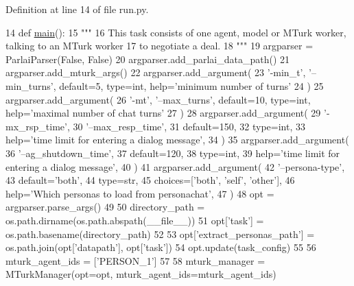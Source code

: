 Definition at line 14 of file run.\+py.


\begin{DoxyCode}
14 \textcolor{keyword}{def }\hyperlink{namespaceprojects_1_1wizard__of__wikipedia_1_1mturk__evaluation__task_1_1run_ad3ab2c71f8083c3112815c0b363d316b}{main}():
15     \textcolor{stringliteral}{"""}
16 \textcolor{stringliteral}{    This task consists of one agent, model or MTurk worker, talking to an MTurk worker}
17 \textcolor{stringliteral}{    to negotiate a deal.}
18 \textcolor{stringliteral}{    """}
19     argparser = ParlaiParser(\textcolor{keyword}{False}, \textcolor{keyword}{False})
20     argparser.add\_parlai\_data\_path()
21     argparser.add\_mturk\_args()
22     argparser.add\_argument(
23         \textcolor{stringliteral}{'-min\_t'}, \textcolor{stringliteral}{'--min\_turns'}, default=5, type=int, help=\textcolor{stringliteral}{'minimum number of turns'}
24     )
25     argparser.add\_argument(
26         \textcolor{stringliteral}{'-mt'}, \textcolor{stringliteral}{'--max\_turns'}, default=10, type=int, help=\textcolor{stringliteral}{'maximal number of chat turns'}
27     )
28     argparser.add\_argument(
29         \textcolor{stringliteral}{'-mx\_rsp\_time'},
30         \textcolor{stringliteral}{'--max\_resp\_time'},
31         default=150,
32         type=int,
33         help=\textcolor{stringliteral}{'time limit for entering a dialog message'},
34     )
35     argparser.add\_argument(
36         \textcolor{stringliteral}{'--ag\_shutdown\_time'},
37         default=120,
38         type=int,
39         help=\textcolor{stringliteral}{'time limit for entering a dialog message'},
40     )
41     argparser.add\_argument(
42         \textcolor{stringliteral}{'--persona-type'},
43         default=\textcolor{stringliteral}{'both'},
44         type=str,
45         choices=[\textcolor{stringliteral}{'both'}, \textcolor{stringliteral}{'self'}, \textcolor{stringliteral}{'other'}],
46         help=\textcolor{stringliteral}{'Which personas to load from personachat'},
47     )
48     opt = argparser.parse\_args()
49 
50     directory\_path = os.path.dirname(os.path.abspath(\_\_file\_\_))
51     opt[\textcolor{stringliteral}{'task'}] = os.path.basename(directory\_path)
52 
53     opt[\textcolor{stringliteral}{'extract\_personas\_path'}] = os.path.join(opt[\textcolor{stringliteral}{'datapath'}], opt[\textcolor{stringliteral}{'task'}])
54     opt.update(task\_config)
55 
56     mturk\_agent\_ids = [\textcolor{stringliteral}{'PERSON\_1'}]
57 
58     mturk\_manager = MTurkManager(opt=opt, mturk\_agent\_ids=mturk\_agent\_ids)

\end{DoxyCode}
